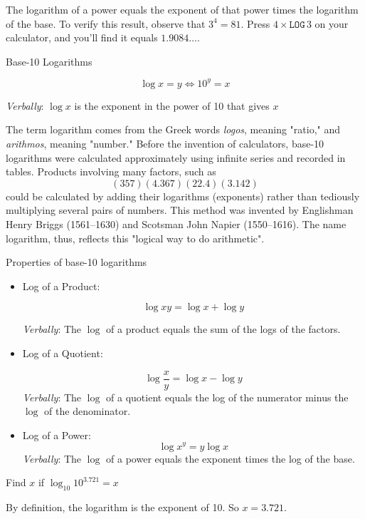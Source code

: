 The logarithm of a power equals the exponent of that power times the logarithm of the base. To verify this result, observe that \(3^4 = 81\). Press \(4 \times \texttt{LOG}\,3\) on your calculator, and you'll find it equals \(1.9084 \ldots\).

\begin{definition}{Base-10 Logarithms}

\[
\log x=y \iff 10^y=x
\]

\textit{Verbally}: $\log x$ is the exponent in the power of 10 that gives $x$   
\end{definition}

The term logarithm comes from the Greek words \emph{logos}, meaning "ratio," and \emph{arithmos}, meaning "number." Before the invention of calculators, base-10 logarithms were calculated approximately using infinite series and recorded in tables. Products involving many factors, such as
\[
(357)(4.367)(22.4)(3.142)
\]
could be calculated by adding their logarithms (exponents) rather than tediously multiplying several pairs of numbers. This method was invented by Englishman Henry Briggs (1561–1630) and Scotsman John Napier (1550–1616). The name logarithm, thus, reflects this "logical way to do arithmetic".

\begin{custombox}{Properties of base-10 logarithms}
\begin{itemize}
    \item Log of a Product:
    
    \[
    \log x y=\log x+\log y
    \]
    
    \textit{Verbally}: The $\log$ of a product equals the sum of the logs of the factors.
    \vspace{0.2cm}
    \item Log of a Quotient:
    
    \[
    \log \frac{x}{y}=\log x-\log y
    \]
    \vspace{0.1cm}
    \textit{Verbally}: The $\log$ of a quotient equals the log of the numerator minus the $\log$ of the denominator.
    \vspace{0.2cm}
    \item Log of a Power:
    \[
    \log x^y=y \log x
    \]
    \textit{Verbally}: The $\log$ of a power equals the exponent times the log of the base.
\end{itemize}

   
\end{custombox}

\begin{example} Find $x$ if $\log_{10} 10^{3.721}=x$

\begin{solution}
By definition, the logarithm is the exponent of 10. So $x=3.721$.
\end{solution}
\end{example}

